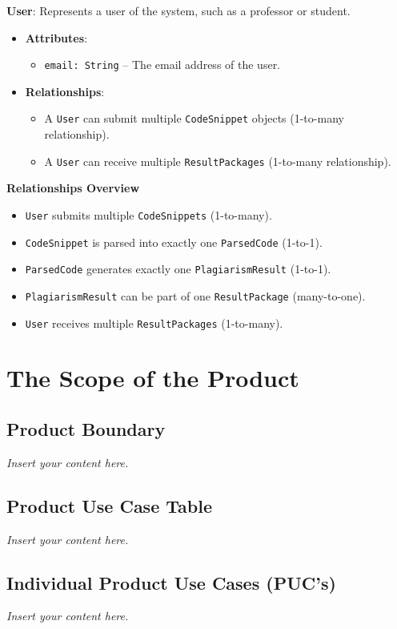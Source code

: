 \documentclass[12pt]{article}
\newcommand{\lips}{\textit{Insert your content here.}}
\begin{document}
\textbf{User}: Represents a user of the system, such as a professor or student.
\begin{itemize}
    \item \textbf{Attributes}:
    \begin{itemize}
        \item \texttt{email: String} -- The email address of the user.
    \end{itemize}
    \item \textbf{Relationships}:
    \begin{itemize}
        \item A \texttt{User} can submit multiple \texttt{CodeSnippet} objects (1-to-many relationship).
        \item A \texttt{User} can receive multiple \texttt{ResultPackages} (1-to-many relationship).
    \end{itemize}
\end{itemize}

\textbf{Relationships Overview}
\begin{itemize}
    \item \texttt{User} submits multiple \texttt{CodeSnippets} (1-to-many).
    \item \texttt{CodeSnippet} is parsed into exactly one \texttt{ParsedCode} (1-to-1).
    \item \texttt{ParsedCode} generates exactly one \texttt{PlagiarismResult} (1-to-1).
    \item \texttt{PlagiarismResult} can be part of one \texttt{ResultPackage} (many-to-one).
    \item \texttt{User} receives multiple \texttt{ResultPackages} (1-to-many).
\end{itemize}



\section{The Scope of the Product}
\subsection{Product Boundary}
\lips
\subsection{Product Use Case Table}
\lips
\subsection{Individual Product Use Cases (PUC's)}
\lips
\end{document}
